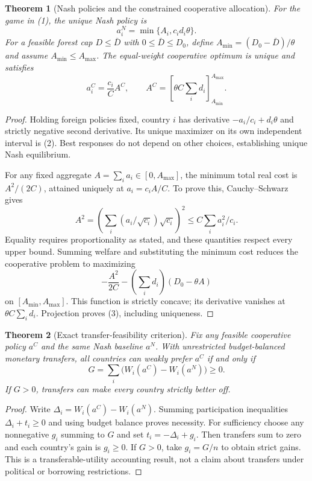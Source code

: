 \documentclass[11pt]{article}
\newtheorem{theorem}{Theorem}
\theoremstyle{definition}
\begin{document}
\begin{theorem}[Nash policies and the constrained cooperative allocation]
For the game in (1), the unique Nash policy is
\[
 a_i^N=\min\{A_i,c_id_i\theta\}.
 \tag{2}
\]
For a feasible forest cap $D\leq\bar D$ with $0\leq\bar D\leq D_0$, define $A_{\min}=(D_0-\bar D)/\theta$ and assume $A_{\min}\leq A_{\max}$. The equal-weight cooperative optimum is unique and satisfies
\[
 a_i^C=\frac{c_i}{C}A^C,\qquad
 A^C=\left[\theta C\sum_i d_i\right]_{A_{\min}}^{A_{\max}}.
 \tag{3}
\]
\end{theorem}
\begin{proof}
Holding foreign policies fixed, country $i$ has derivative $-a_i/c_i+d_i\theta$ and strictly negative second derivative. Its unique maximizer on its own independent interval is (2). Best responses do not depend on other choices, establishing unique Nash equilibrium.

For any fixed aggregate $A=\sum_i a_i\in[0,A_{\max}]$, the minimum total real cost is $A^2/(2C)$, attained uniquely at $a_i=c_iA/C$. To prove this, Cauchy--Schwarz gives
\[
 A^2=\left(\sum_i(a_i/\sqrt{c_i})\sqrt{c_i}\right)^2
 \leq C\sum_i a_i^2/c_i.
\]
Equality requires proportionality as stated, and these quantities respect every upper bound. Summing welfare and substituting the minimum cost reduces the cooperative problem to maximizing
\[
 -\frac{A^2}{2C}-\left(\sum_i d_i\right)(D_0-\theta A)
\]
on $[A_{\min},A_{\max}]$. This function is strictly concave; its derivative vanishes at $\theta C\sum_i d_i$. Projection proves (3), including uniqueness.
\end{proof}

\begin{theorem}[Exact transfer-feasibility criterion]
Fix any feasible cooperative policy $a^C$ and the same Nash baseline $a^N$. With unrestricted budget-balanced monetary transfers, all countries can weakly prefer $a^C$ if and only if
\[
 G=\sum_i\bigl(W_i(a^C)-W_i(a^N)\bigr)\geq0.
 \tag{4}
\]
If $G>0$, transfers can make every country strictly better off.
\end{theorem}
\begin{proof}
Write $\Delta_i=W_i(a^C)-W_i(a^N)$. Summing participation inequalities $\Delta_i+t_i\geq0$ and using budget balance proves necessity. For sufficiency choose any nonnegative $g_i$ summing to $G$ and set $t_i=-\Delta_i+g_i$. Then transfers sum to zero and each country's gain is $g_i\geq0$. If $G>0$, take $g_i=G/n$ to obtain strict gains. This is a transferable-utility accounting result, not a claim about transfers under political or borrowing restrictions.
\end{proof}
\end{document}
